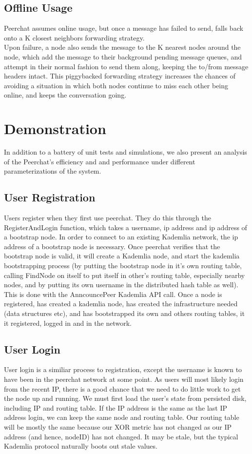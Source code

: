 \documentclass{article}
\begin{document}
\subsection{Offline Usage}

Peerchat assumes online usage, but once a message has failed to send, falls back onto a K closest neighbors forwarding strategy. \\

Upon failure, a node also sends the message to the K nearest nodes around the node, which add the message to their background pending message queues, and attempt in their normal fashion to send them along, keeping the to/from message headers intact. This piggybacked forwarding strategy increases the chances of avoiding a situation in which both nodes continue to miss each other being online, and keeps the conversation going. 

\section{Demonstration}

In addition to a battery of unit tests and simulations, we also present an analysis of the Peerchat's efficiency and and performance under different parameterizations of the system. 

\subsection{User Registration}
Users register when they first use peerchat. They do this through the RegisterAndLogin function, which takes a username, ip address and ip address of a bootstrap node. In order to connect to an existing Kademlia network, the ip address of a bootstrap node is necessary. Once peerchat verifies that the bootstrap node is valid, it will create a Kademlia node, and start the kademlia bootstrapping process (by putting the bootstrap node in it's own routing table, calling FindNode on itself to put itself in other's routing table, especially nearby nodes, and by putting its own username in the distributed hash table as well). This is done with the AnncouncePeer Kademlia API call. Once a node is registered, has created a kademlia node, has created the infrastructure needed (data structures etc), and has bootstrapped its own and others routing tables, it it registered, logged in and in the network.
\subsection{User Login}
User login is a similiar process to registration, except the username is known to have been in the peerchat network at some point. As users will most likely login from the recent IP, there is a good chance that we need to do little work to get the node up and running. We must first load the user's state from persisted disk, including IP and routing table. If the IP address is the same as the last IP address login, we can keep the same node and routing table. Our routing table will be mostly the same because our XOR metric has not changed as our IP address (and hence, nodeID) has not changed. It may be stale, but the typical Kademlia protocol naturally boots out stale values. 
\end{document}
